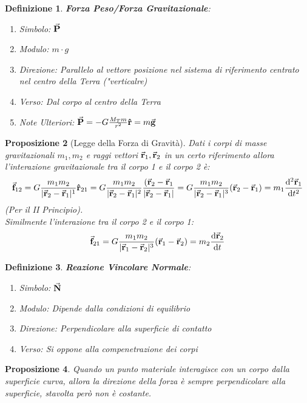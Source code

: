 \documentclass{article}
\newtheorem{defn}{Definizione}[section]
\newtheorem{prop}[defn]{Proposizione}
\renewcommand{\r}{\va{r}}
\newcommand{\f}{\va{f}}
\begin{document}
\begin{defn}
\textbf{Forza Peso/Forza Gravitazionale}:
\begin{enumerate}
    \item Simbolo: $\va{P}$
    \item Modulo: $m\cdot g$
    \item Direzione: Parallelo al vettore posizione nel sistema di riferimento centrato nel centro della Terra ("verticalre)
    \item Verso: Dal corpo al centro della Terra
    \item Note Ulteriori: \(\va{P}=-G\frac{M_Tm}{r^2}\vu{r}=m\va{g}\)
\end{enumerate}
\end{defn}
\begin{prop}[Legge della Forza di Gravità]
Dati i corpi di masse gravitazionali $m_1,m_2$ e raggi vettori $\r_1,\r_2$ in un certo riferimento allora l'interazione gravitazionale tra il corpo 1 e il corpo 2 è:
\[\f_{12}=G\frac{m_1m_2}{|\r_2-\r_1|^1}\vu{r}_{21}=G\frac{m_1m_2}{|\r_2-\r_1|^2}\frac{(\r_2-\r_1}{|\r_2-\r_1|}=G\frac{m_1m_2}{|\r_2-\r_1|^3}(\r_2-\r_1)=m_1\dv[2]{\r_1}{t}\]
(Per il II Principio).\\
Similmente l'interazione tra il corpo 2 e il corpo 1:
\[\f_{21}=G\frac{m_1m_2}{|\r_1-\r_2|^3}(\r_1-\r_2)=m_2\dv{\r_2}{t}\]
\end{prop}


\begin{defn}
\textbf{Reazione Vincolare Normale}:
\begin{enumerate}
    \item Simbolo: $\va{N}$
    \item Modulo: Dipende dalla condizioni di equilibrio
    \item Direzione: Perpendicolare alla superficie di contatto
    \item Verso: Si oppone alla compenetrazione dei corpi
\end{enumerate}
\end{defn}
\begin{prop}
Quando un punto materiale interagisce con un corpo dalla superficie curva, allora la direzione della forza è sempre perpendicolare alla superficie, stavolta però non è costante.
\end{prop}
\end{document}
